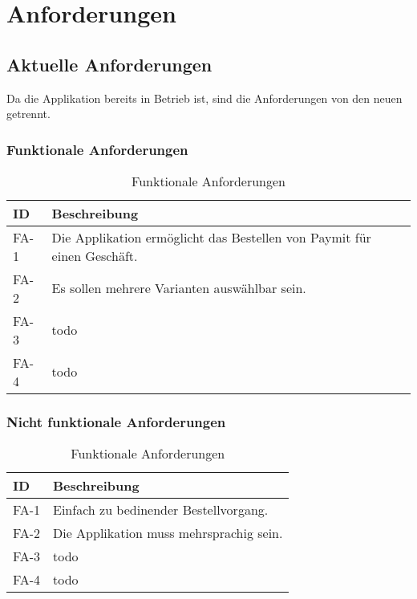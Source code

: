 \chapter{Anforderungen}

\section{Aktuelle Anforderungen}

Da die Applikation bereits in Betrieb ist, sind die Anforderungen von den neuen getrennt.

\subsection{Funktionale Anforderungen}

\begin{table}[H]
	\centering
	\caption{Funktionale Anforderungen}
	\begin{tabular}{ | p{2cm} | p{14cm} | }
		\toprule
		{\textbf{ID}} & {\textbf{Beschreibung}} \\
		\midrule
		FA-1 & Die Applikation ermöglicht das Bestellen von Paymit für einen Geschäft.  \\ \hline
		FA-2 & Es sollen mehrere Varianten auswählbar sein. \\ \hline
		FA-3 & todo \\ \hline
		FA-4 & todo \\
		\bottomrule
	\end{tabular}
\end{table}
	
\subsection{Nicht funktionale Anforderungen}

\begin{table}[H]
	\centering
	\caption{Funktionale Anforderungen}
	\begin{tabular}{ | p{2cm} | p{14cm} | }
		\toprule
		{\textbf{ID}} & {\textbf{Beschreibung}} \\
		\midrule
		FA-1 & Einfach zu bedinender Bestellvorgang. \\ \hline
		FA-2 & Die Applikation muss mehrsprachig sein. \\ \hline
		FA-3 & todo \\ \hline
		FA-4 & todo \\
		\bottomrule
	\end{tabular}
\end{table}


